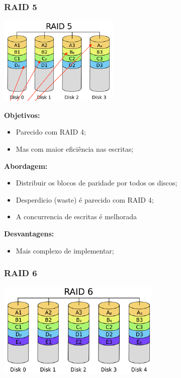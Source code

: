 \documentclass{article}
\begin{document}
\subsubsection{RAID 5}

\begin{center}
  \includegraphics[scale=0.6]{37}
\end{center}

\begin{flushleft}
  \textbf{Objetivos:}
  \begin{itemize}
    \item Parecido com RAID 4;
    \item Mas com maior eficiência nas escritas;
  \end{itemize}

  \textbf{Abordagem:}
  \begin{itemize}
    \item Distribuir os blocos de paridade por todos os discos;
    \item Desperdicio (waste) é parecido com RAID 4;
    \item A concurrencia de escritas é melhorada
  \end{itemize}

  \textbf{Desvantagens:}
  \begin{itemize}
    \item Mais complexo de implementar;
  \end{itemize}
\end{flushleft}

\pagebreak

\subsubsection{RAID 6}

\begin{center}
  \includegraphics[scale=0.6]{38}
\end{center}
\end{document}
